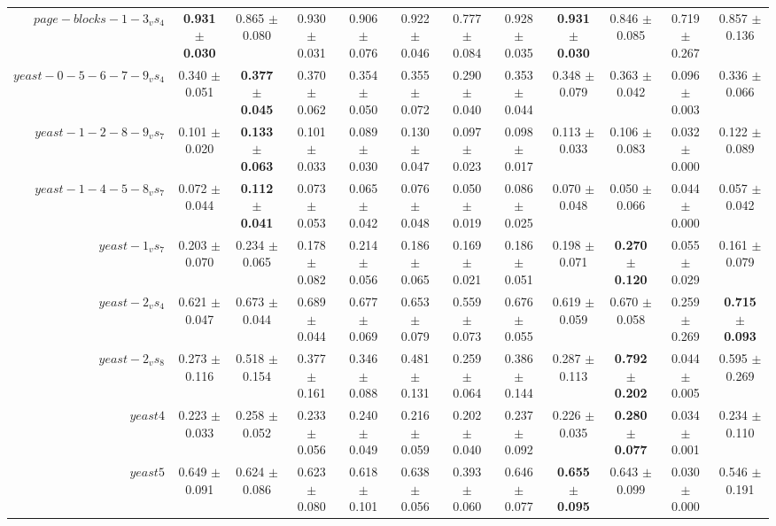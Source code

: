 \begin{table}[!ht]
{\begin{tabular}{r c c c c c c c c c c c}
$page-blocks-1-3_vs_4$ & \textbf{0.931 $\pm$ 0.030} & 0.865 $\pm$ 0.080 & 0.930 $\pm$ 0.031 & 0.906 $\pm$ 0.076 & 0.922 $\pm$ 0.046 & 0.777 $\pm$ 0.084 & 0.928 $\pm$ 0.035 & \textbf{0.931 $\pm$ 0.030} & 0.846 $\pm$ 0.085 & 0.719 $\pm$ 0.267 & 0.857 $\pm$ 0.136 \\
$yeast-0-5-6-7-9_vs_4$ & 0.340 $\pm$ 0.051 & \textbf{0.377 $\pm$ 0.045} & 0.370 $\pm$ 0.062 & 0.354 $\pm$ 0.050 & 0.355 $\pm$ 0.072 & 0.290 $\pm$ 0.040 & 0.353 $\pm$ 0.044 & 0.348 $\pm$ 0.079 & 0.363 $\pm$ 0.042 & 0.096 $\pm$ 0.003 & 0.336 $\pm$ 0.066 \\
$yeast-1-2-8-9_vs_7$ & 0.101 $\pm$ 0.020 & \textbf{0.133 $\pm$ 0.063} & 0.101 $\pm$ 0.033 & 0.089 $\pm$ 0.030 & 0.130 $\pm$ 0.047 & 0.097 $\pm$ 0.023 & 0.098 $\pm$ 0.017 & 0.113 $\pm$ 0.033 & 0.106 $\pm$ 0.083 & 0.032 $\pm$ 0.000 & 0.122 $\pm$ 0.089 \\
$yeast-1-4-5-8_vs_7$ & 0.072 $\pm$ 0.044 & \textbf{0.112 $\pm$ 0.041} & 0.073 $\pm$ 0.053 & 0.065 $\pm$ 0.042 & 0.076 $\pm$ 0.048 & 0.050 $\pm$ 0.019 & 0.086 $\pm$ 0.025 & 0.070 $\pm$ 0.048 & 0.050 $\pm$ 0.066 & 0.044 $\pm$ 0.000 & 0.057 $\pm$ 0.042 \\
$yeast-1_vs_7$ & 0.203 $\pm$ 0.070 & 0.234 $\pm$ 0.065 & 0.178 $\pm$ 0.082 & 0.214 $\pm$ 0.056 & 0.186 $\pm$ 0.065 & 0.169 $\pm$ 0.021 & 0.186 $\pm$ 0.051 & 0.198 $\pm$ 0.071 & \textbf{0.270 $\pm$ 0.120} & 0.055 $\pm$ 0.029 & 0.161 $\pm$ 0.079 \\
$yeast-2_vs_4$ & 0.621 $\pm$ 0.047 & 0.673 $\pm$ 0.044 & 0.689 $\pm$ 0.044 & 0.677 $\pm$ 0.069 & 0.653 $\pm$ 0.079 & 0.559 $\pm$ 0.073 & 0.676 $\pm$ 0.055 & 0.619 $\pm$ 0.059 & 0.670 $\pm$ 0.058 & 0.259 $\pm$ 0.269 & \textbf{0.715 $\pm$ 0.093} \\
$yeast-2_vs_8$ & 0.273 $\pm$ 0.116 & 0.518 $\pm$ 0.154 & 0.377 $\pm$ 0.161 & 0.346 $\pm$ 0.088 & 0.481 $\pm$ 0.131 & 0.259 $\pm$ 0.064 & 0.386 $\pm$ 0.144 & 0.287 $\pm$ 0.113 & \textbf{0.792 $\pm$ 0.202} & 0.044 $\pm$ 0.005 & 0.595 $\pm$ 0.269 \\
$yeast4$ & 0.223 $\pm$ 0.033 & 0.258 $\pm$ 0.052 & 0.233 $\pm$ 0.056 & 0.240 $\pm$ 0.049 & 0.216 $\pm$ 0.059 & 0.202 $\pm$ 0.040 & 0.237 $\pm$ 0.092 & 0.226 $\pm$ 0.035 & \textbf{0.280 $\pm$ 0.077} & 0.034 $\pm$ 0.001 & 0.234 $\pm$ 0.110 \\
$yeast5$ & 0.649 $\pm$ 0.091 & 0.624 $\pm$ 0.086 & 0.623 $\pm$ 0.080 & 0.618 $\pm$ 0.101 & 0.638 $\pm$ 0.056 & 0.393 $\pm$ 0.060 & 0.646 $\pm$ 0.077 & \textbf{0.655 $\pm$ 0.095} & 0.643 $\pm$ 0.099 & 0.030 $\pm$ 0.000 & 0.546 $\pm$ 0.191 \\

\end{tabular}}
\end{table}
